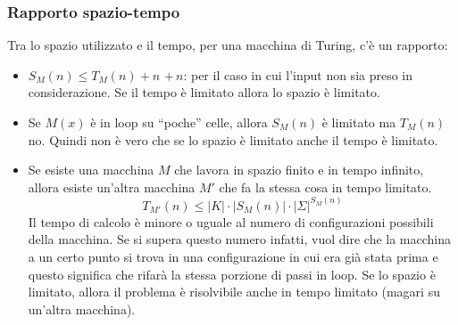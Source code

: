 \subsubsection{Rapporto spazio-tempo}
Tra lo spazio utilizzato e il tempo, per una macchina di Turing, c'è un rapporto:
\begin{itemize}
    \item $S_M(n) \leq T_M(n) + n$ $+ \, n$: per il caso in cui l’input non sia preso in considerazione. Se il tempo è limitato allora lo spazio è limitato.
    \item Se $M(x)$ è in loop su “poche” celle, allora $S_M(n)$ è limitato ma $T_M(n)$ no.  Quindi non è vero che se lo spazio è limitato anche il tempo è limitato.
    \item Se esiste una macchina $M$ che lavora in spazio finito e in tempo infinito, allora esiste un’altra macchina $M'$ che fa la stessa cosa in tempo limitato. 
    $$T_{M'}(n) \leq |K|\cdot |S_M(n)| \cdot |\Sigma|^{S_M(n)}$$
    Il tempo di calcolo è minore o uguale al numero di configurazioni possibili della macchina.
    Se si supera questo numero infatti, vuol dire che la macchina a un certo punto si trova in una configurazione in cui era già stata prima e questo significa che rifarà la stessa porzione di passi in loop.
    Se lo spazio è limitato, allora il problema è risolvibile anche in tempo limitato (magari su un’altra macchina).
\end{itemize}